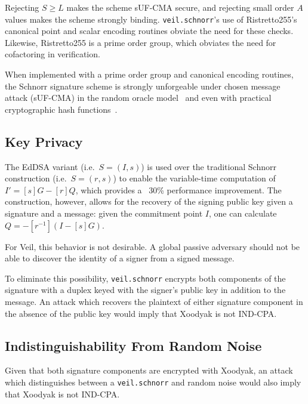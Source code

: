 Rejecting $S \geq L$ makes the scheme sUF-CMA secure, and rejecting small order $A$ values makes the scheme strongly
binding.
\texttt{veil.schnorr}'s use of Ristretto255's canonical point and scalar encoding routines obviate the need for these
checks.
Likewise, Ristretto255 is a prime order group, which obviates the need for cofactoring in verification.

When implemented with a prime order group and canonical encoding routines, the Schnorr signature scheme is strongly
unforgeable under chosen message attack (sUF-CMA) in the random oracle model~\cite{pointcheval2000} and even with
practical cryptographic hash functions~\cite{neven2009}.

\subsection{Key Privacy}\label{subsec:veil.schnorr-key-privacy}

The EdDSA variant (i.e.\ $S=(I,s)$) is used over the traditional Schnorr construction (i.e.\ $S=(r,s)$) to enable the
variable-time computation of $I'=[s]G - [r]Q$, which provides a ~30\% performance improvement.
The construction, however, allows for the recovery of the signing public key given a signature and a message: given the
commitment point $I$, one can calculate $Q=-[r^{-1}](I - [s]G)$.

For Veil, this behavior is not desirable.
A global passive adversary should not be able to discover the identity of a signer from a signed message.

To eliminate this possibility, \texttt{veil.schnorr} encrypts both components of the signature with a duplex keyed with
the signer's public key in addition to the message.
An attack which recovers the plaintext of either signature component in the absence of the public key would imply that
Xoodyak is not IND-CPA\@.

\subsection{Indistinguishability From Random Noise}\label{subsec:veil.schnorr-indistinguishability}

Given that both signature components are encrypted with Xoodyak, an attack which distinguishes between a
\texttt{veil.schnorr} and random noise would also imply that Xoodyak is not IND-CPA\@.

